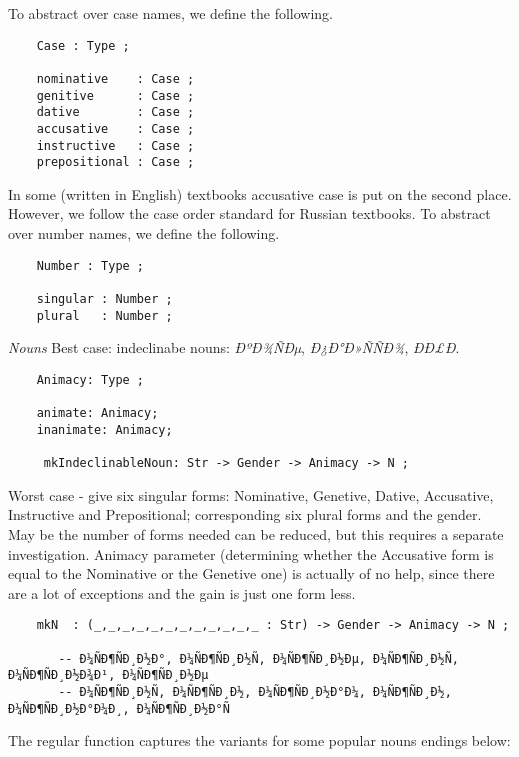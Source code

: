 \documentclass[11pt,a4paper]{article}
\newcommand{\subsubsubsection}[1]{\textit{#1}}
\begin{document}
To abstract over case names, we define the following.

\begin{verbatim}
    Case : Type ;
  
    nominative    : Case ;
    genitive      : Case ;
    dative        : Case ;
    accusative    : Case ; 
    instructive   : Case ;
    prepositional : Case ;
\end{verbatim}

In some (written in English) textbooks accusative case 
is put on the second place. However, we follow the case order 
standard for Russian textbooks.
To abstract over number names, we define the following.

\begin{verbatim}
    Number : Type ;
  
    singular : Number ;
    plural   : Number ;
\end{verbatim}

\subsubsubsection{Nouns}
Best case: indeclinabe nouns: \textit{ÐºÐ¾ÑÐµ}, \textit{Ð¿Ð°Ð»ÑÑÐ¾}, \textit{ÐÐ£Ð}.

\begin{verbatim}
    Animacy: Type ; 
  
    animate: Animacy;
    inanimate: Animacy; 
  
     mkIndeclinableNoun: Str -> Gender -> Animacy -> N ; 
\end{verbatim}

Worst case - give six singular forms:
Nominative, Genetive, Dative, Accusative, Instructive and Prepositional;
corresponding six plural forms and the gender.
May be the number of forms needed can be reduced, 
but this requires a separate investigation.
Animacy parameter (determining whether the Accusative form is equal 
to the Nominative or the Genetive one) is actually of no help, 
since there are a lot of exceptions and the gain is just one form less.

\begin{verbatim}
    mkN  : (_,_,_,_,_,_,_,_,_,_,_,_ : Str) -> Gender -> Animacy -> N ; 
  
       -- Ð¼ÑÐ¶ÑÐ¸Ð½Ð°, Ð¼ÑÐ¶ÑÐ¸Ð½Ñ, Ð¼ÑÐ¶ÑÐ¸Ð½Ðµ, Ð¼ÑÐ¶ÑÐ¸Ð½Ñ, Ð¼ÑÐ¶ÑÐ¸Ð½Ð¾Ð¹, Ð¼ÑÐ¶ÑÐ¸Ð½Ðµ
       -- Ð¼ÑÐ¶ÑÐ¸Ð½Ñ, Ð¼ÑÐ¶ÑÐ¸Ð½, Ð¼ÑÐ¶ÑÐ¸Ð½Ð°Ð¼, Ð¼ÑÐ¶ÑÐ¸Ð½, Ð¼ÑÐ¶ÑÐ¸Ð½Ð°Ð¼Ð¸, Ð¼ÑÐ¶ÑÐ¸Ð½Ð°Ñ
\end{verbatim}

The regular function captures the variants for some popular nouns 
endings below:
\end{document}
